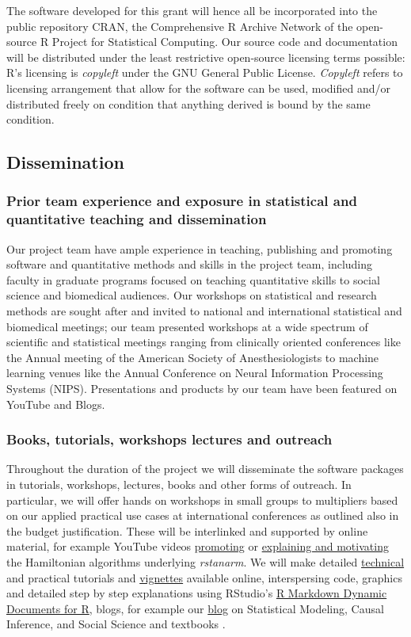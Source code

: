 \documentclass[11pt,notitlepage]{article}
\begin{document}
The software developed for this grant will hence all be incorporated into the public repository CRAN, the Comprehensive R Archive Network of the open-source R Project for Statistical Computing. Our source code and documentation will be distributed under the least restrictive open-source licensing terms possible: R's licensing is \textit{copyleft} under the GNU General Public License. \textit{Copyleft} refers to licensing arrangement that allow for the software can be used, modified and/or distributed freely on condition that anything derived is bound by the same condition. 

\subsection*{Dissemination}
\subsubsection*{Prior team experience and exposure in statistical and quantitative teaching and dissemination}
Our project team have ample experience in teaching, publishing and promoting software and quantitative methods and skills in the project team, including faculty in graduate programs focused on teaching quantitative skills to social science and biomedical audiences. Our workshops on statistical and research methods are sought after and invited to national and international statistical and biomedical meetings; our team presented workshops at a wide spectrum of scientific and statistical meetings ranging from clinically oriented conferences like the Annual meeting of the American Society of Anesthesiologists to machine learning venues like the Annual Conference on Neural Information Processing Systems (NIPS). Presentations  and products by our team have been featured on YouTube and Blogs.   

\subsubsection*{Books, tutorials, workshops lectures and outreach}
Throughout the duration of the project we will disseminate the software packages in tutorials, workshops, lectures, books and other forms of outreach. In particular, we will offer hands on workshops in small groups to multipliers based on our applied practical use cases at international conferences as outlined also in the budget justification. These will be interlinked and supported by online material, for example YouTube videos \href{https://www.youtube.com/watch?v=pWow8Qe1snQ}{promoting} or \href{https://www.youtube.com/watch?v=pHsuIaPbNbY}{explaining and motivating} the Hamiltonian algorithms underlying \textit{rstanarm}. We will make detailed \href{http://mc-stan.org/documentation/}{technical} and practical tutorials and \href{https://cran.r-project.org/web/packages/rstanarm/vignettes/aov.html}{vignettes} available online, interspersing code, graphics and detailed step by step explanations using RStudio's  \href{http://rmarkdown.rstudio.com/}{R Markdown \- Dynamic Documents for R}, blogs, for example our \href{http://andrewgelman.com/}{blog} on Statistical Modeling, Causal Inference, and Social Science and textbooks \cite{Gelman-Hill_2014}. 
\end{document}
